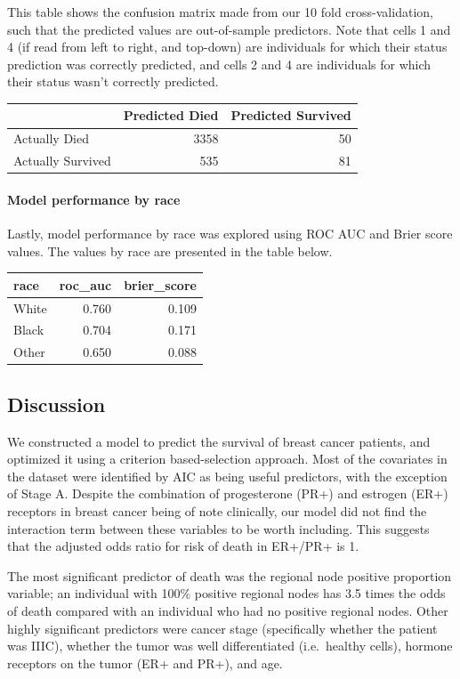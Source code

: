 \documentclass[]{article}
\let\oldparagraph\paragraph
\renewcommand{\paragraph}[1]{\oldparagraph{#1}\mbox{}}
\begin{document}
This table shows the confusion matrix made from our 10 fold
cross-validation, such that the predicted values are out-of-sample
predictors. Note that cells 1 and 4 (if read from left to right, and
top-down) are individuals for which their status prediction was
correctly predicted, and cells 2 and 4 are individuals for which their
status wasn't correctly predicted.

\begin{longtable}[]{@{}lrr@{}}
\toprule
& Predicted Died & Predicted Survived\tabularnewline
\midrule
\endhead
Actually Died & 3358 & 50\tabularnewline
Actually Survived & 535 & 81\tabularnewline
\bottomrule
\end{longtable}

\hypertarget{model-performance-by-race}{%
\paragraph{Model performance by race}\label{model-performance-by-race}}

Lastly, model performance by race was explored using ROC AUC and Brier
score values. The values by race are presented in the table below.

\begin{longtable}[]{@{}lrr@{}}
\toprule
race & roc\_auc & brier\_score\tabularnewline
\midrule
\endhead
White & 0.760 & 0.109\tabularnewline
Black & 0.704 & 0.171\tabularnewline
Other & 0.650 & 0.088\tabularnewline
\bottomrule
\end{longtable}

\hypertarget{discussion}{%
\subsection{Discussion}\label{discussion}}

We constructed a model to predict the survival of breast cancer
patients, and optimized it using a criterion based-selection approach.
Most of the covariates in the dataset were identified by AIC as being
useful predictors, with the exception of Stage A. Despite the
combination of progesterone (PR+) and estrogen (ER+) receptors in breast
cancer being of note clinically, our model did not find the interaction
term between these variables to be worth including. This suggests that
the adjusted odds ratio for risk of death in ER+/PR+ is 1.

The most significant predictor of death was the regional node positive
proportion variable; an individual with 100\% positive regional nodes
has 3.5 times the odds of death compared with an individual who had no
positive regional nodes. Other highly significant predictors were cancer
stage (specifically whether the patient was IIIC), whether the tumor was
well differentiated (i.e.~healthy cells), hormone receptors on the tumor
(ER+ and PR+), and age.
\end{document}
